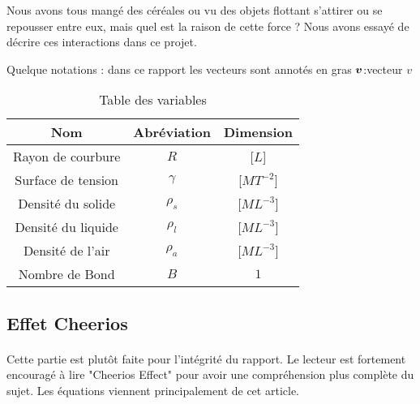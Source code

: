 Nous avons tous mangé des céréales ou vu des objets flottant s'attirer ou se repousser entre eux, mais quel est la raison de cette force ? Nous avons essayé de décrire ces interactions dans ce projet.

Quelque notations : dans ce rapport les vecteurs sont annotés en gras $\vb*{v}$:vecteur $v$
\begin{table}[H]
    \centering
    \begin{tabular}{ccc}
        \hline
        Nom                & Abréviation & Dimension\\
        \hline
        Rayon de courbure  & $R$         & [$L$]\\
        Surface de tension & $\gamma$    & [$MT^{-2}$]\\ 
        Densité du solide  & $\rho_s$    & [$ML^{-3}$]\\
        Densité du liquide & $\rho_l$    & [$ML^{-3}$]\\
        Densité de l'air   & $\rho_a$    & [$ML^{-3}$]\\
        Nombre de Bond     & $B$         & $1$\\
        \hline
    \end{tabular}
    \caption{Table des variables}
\end{table}

\subsection{Effet Cheerios}
    \paragraph*{}{
        Cette partie est plutôt faite pour l'intégrité du rapport. Le lecteur est fortement encouragé à lire "Cheerios Effect"\cite{vella_cheerios_2005} pour avoir une compréhension plus complète du sujet. Les équations viennent principalement de cet article.
    }

